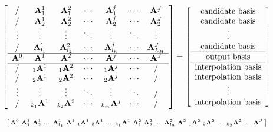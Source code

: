 \documentclass[12pt]{article}
\begin{document}
\begin{equation}
\left[
\begin{array}{ccccccc}
/ & \mathbf{A}^1_1 & \mathbf{A}^2_1 & \cdots & \mathbf{A}^j_1 &\cdots & \mathbf{A}^J_1 \\
/ & \mathbf{A}^1_2 & \mathbf{A}^2_2 & \cdots & \mathbf{A}^j_2 &\cdots & \mathbf{A}^J_2 \\
\vdots & \vdots & \vdots & \ddots & \vdots & \ddots &\vdots   \\
/ &\mathbf{A}^1_{l_1} & \mathbf{A}^2_{l_2} & \cdots & \mathbf{A}^j_{l_h} &\cdots & \mathbf{A}^J_{L_H}\\
\hline
\mathbf{A}^0 & \mathbf{A}^1 & \mathbf{A}^2 & \cdots & \mathbf{A}^j  &\cdots & \mathbf{A}^J\\
\hline
/ &{}_{1}\mathbf{A}^1 & {}_{1}\mathbf{A}^2 & \cdots &{}_{1}\mathbf{A}^j & \cdots & /\\
/ &{}_{2}\mathbf{A}^1 & {}_{2}\mathbf{A}^2 & \cdots &{}_{2}\mathbf{A}^j & \cdots & / \\
\vdots & \vdots & \vdots & \ddots & \vdots  & \ddots & / \\
/ &{}_{k_1}\mathbf{A}^1 & {}_{k_2}\mathbf{A}^2 & \cdots &{}_{k_m}\mathbf{A}^j & \cdots & / \\
\end{array}
\right]
= 
\left[
\begin{array}{c}
\vphantom{A^J_1}\text{candidate basis} \\
\vphantom{A^J_2}\text{candidate basis} \\
\vphantom{\vdots} \vdots \\
\vphantom{A^J_{L_H}}\text{candidate basis} \\
\hline
\vphantom{A^J}\text{output basis} \\
\hline
\vphantom{\text{NULL}}\text{interpolation basis} \\
\vphantom{\text{NULL}}\text{interpolation basis} \\
\vphantom{\text{NULL}}\vdots \\
\vphantom{\text{NULL}}\text{interpolation basis} \\
\end{array}
\right]
\label{eq:matrixA}
\end{equation}

\begin{equation}
\begin{bsmallmatrix}
\mathbf{A}^0 &\mathbf{A}^1_1 &  \mathbf{A}^1_{2} & \cdots& \mathbf{A}^1_{l_1} & \mathbf{A}^1 & {}_{1}\mathbf{A}^1& {}_{2}\mathbf{A}^1 &\cdots& {}_{k_1}\mathbf{A}^1 & \mathbf{A}^2_1 & \mathbf{A}^2_{2} & \cdots& \mathbf{A}^2_{l_2} & \mathbf{A}^2 & {}_{1}\mathbf{A}^2 &{}_{2}\mathbf{A}^2 &\cdots& {}_{k_2}\mathbf{A}^2 & \cdots & \mathbf{A}^J
\end{bsmallmatrix} 
\label{eq:vectorA}
\end{equation}
\end{document}
